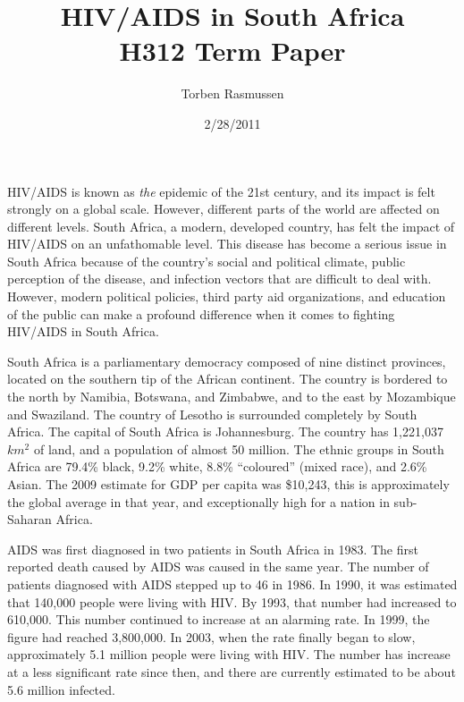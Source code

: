 \documentclass[12pt]{report}
\title{HIV/AIDS in South Africa \\ \normalsize{H312 Term Paper}}
\author{Torben Rasmussen}
\date{2/28/2011}
\begin{document}
\maketitle

HIV/AIDS is known as \emph{the} epidemic of the 21st century, and its impact is felt strongly on a global scale.
However, different parts of the world are affected on different levels.  
South Africa, a modern, developed country, has felt the impact of HIV/AIDS on an unfathomable level.
This disease has become a serious issue in South Africa because of the country's social and political climate, public perception of the disease, and infection vectors that are difficult to deal with.  
However, modern political policies, third party aid organizations, and education of the public can make a profound difference when it comes to fighting HIV/AIDS in South Africa.

South Africa is a parliamentary democracy composed of nine distinct provinces, located on the southern tip of the African continent.
The country is bordered to the north by Namibia, Botswana, and Zimbabwe, and to the east by Mozambique and Swaziland.  
The country of Lesotho is surrounded completely by South Africa.
The capital of South Africa is Johannesburg.
The country has 1,221,037 $km^2$ of land, and a population of almost 50 million.  
The ethnic groups in South Africa are 79.4\% black, 9.2\% white, 8.8\% ``coloured'' (mixed race), and 2.6\% Asian\cite{wiki-sa}.
The 2009 estimate for GDP per capita was \$10,243, this is approximately the global average in that year, and exceptionally high for a nation in sub-Saharan Africa\cite{gap-gdp}.

AIDS was first diagnosed in two patients in South Africa in 1983.
The first reported death caused by AIDS was caused in the same year.
The number of patients diagnosed with AIDS stepped up to 46 in 1986.
In 1990, it was estimated that 140,000 people were living with HIV.
By 1993, that number had increased to 610,000.
This number continued to increase at an alarming rate.  
In 1999, the figure had reached 3,800,000.
In 2003, when the rate finally began to slow, approximately 5.1 million people were living with HIV.
The number has increase at a less significant rate since then, and there are currently estimated to be about 5.6 million infected\cite{gap-prevalence}.
\end{document}
